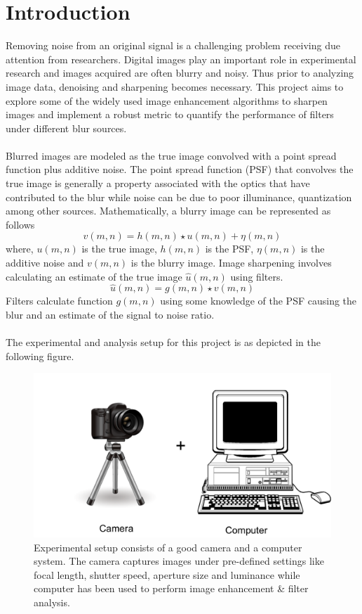 \graphicspath{{mehul_pics/}}%

\chapter{Introduction}
Removing noise from an original signal is a challenging problem receiving due attention from researchers. Digital images play an important role in experimental research and images acquired are often blurry and noisy. Thus prior to analyzing image data, denoising and sharpening becomes necessary. This project aims to explore some of the widely used image enhancement algorithms to sharpen images and implement a robust metric to quantify the performance of filters under different blur sources.\\

\\
Blurred images are modeled as the true image convolved with a point spread function plus additive noise. The point spread function (PSF) that convolves the true image is generally a property associated with the optics that have contributed to the blur while noise can be due to poor illuminance, quantization among other sources. Mathematically, a blurry image can be represented as follows\\
\begin{equation}
v(m,n)= h(m,n) \star u(m,n) + \eta(m,n)
\end{equation}
where, $u(m,n)$ is the true image, $h(m,n)$ is the PSF, $\eta(m,n)$ is the additive noise and $v(m,n)$ is the blurry image. Image sharpening involves calculating an estimate of the true image $\hat{u}(m,n)$ using filters.
\begin{equation}
\hat{u}(m,n)= g(m,n) \star v(m,n)
\end{equation}
Filters calculate function $g(m,n)$ using some knowledge of the PSF causing the blur and an estimate of the signal to noise ratio.\\

\\
The experimental and analysis setup for this project is as depicted in the following figure.
\begin{figure}[h!]
  \centering
                \centering
                \includegraphics[width=.5\textwidth]{experimental_setup.png}
                \caption{Experimental setup consists of a good camera and a computer system. The camera captures images under pre-defined settings like focal length, shutter speed, aperture size and luminance while computer has been used to perform image enhancement \& filter analysis.}
\end{figure}
\newpage